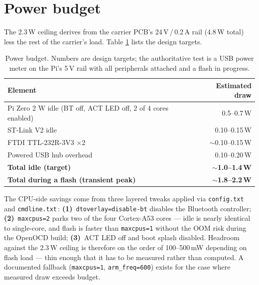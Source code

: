 \documentclass[11pt,a4paper]{article}
\begin{document}
\section{Power budget}

The 2.3\,W ceiling derives from the carrier PCB's 24\,V\,/\,0.2\,A rail
(4.8\,W total) less the rest of the carrier's load. Table
\ref{tab:power} lists the design targets.

\begin{table}[!h]
\centering\small
\renewcommand{\arraystretch}{1.15}
\begin{tabular}{@{} l r @{}}
\toprule
\textbf{Element} & \textbf{Estimated draw} \\
\midrule
Pi Zero 2 W idle (BT off, ACT LED off, 2 of 4 cores enabled) & 0.5--0.7\,W \\
ST-Link V2 idle                                              & 0.10--0.15\,W \\
FTDI TTL-232R-3V3 $\times 2$                                 & $\sim$0.10--0.15\,W \\
Powered USB hub overhead                                     & 0.10--0.20\,W \\
\midrule
\textbf{Total idle (target)}                                 & \textbf{$\sim$1.0--1.4\,W} \\
\textbf{Total during a flash (transient peak)}               & \textbf{$\sim$1.8--2.2\,W} \\
\bottomrule
\end{tabular}
\caption{Power budget. Numbers are design targets; the authoritative
test is a USB power meter on the Pi's 5\,V rail with all peripherals
attached and a flash in progress.}
\label{tab:power}
\end{table}

The CPU-side savings come from three layered tweaks applied via
\texttt{config.txt} and \texttt{cmdline.txt}\,\cite{rpi-config}:
\textbf{(1)}~\texttt{dtoverlay=disable-bt} disables the Bluetooth
controller; \textbf{(2)}~\texttt{maxcpus=2} parks two of the four
Cortex-A53 cores --- idle is nearly identical to single-core, and
flash is faster than \texttt{maxcpus=1} without the OOM risk during
the OpenOCD build; \textbf{(3)}~ACT LED off and boot splash disabled.
Headroom against the 2.3\,W ceiling is therefore on the order of
100--500\,mW depending on flash load --- thin enough that it has to
be measured rather than computed. A documented fallback
(\texttt{maxcpus=1}, \texttt{arm\_freq=600}) exists for the case
where measured draw exceeds budget.
\end{document}
